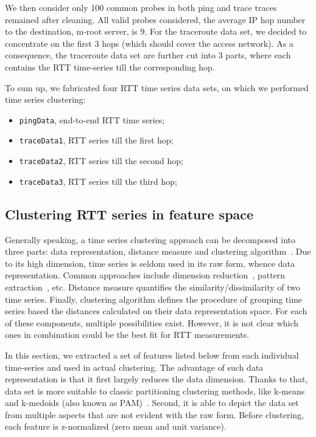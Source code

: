 We then consider only 100 common probes in both ping and trace traces remained after cleaning.
All valid probes considered, the average IP hop number to the destination, m-root server, is 9. 
For the traceroute data set, we decided to concentrate on the first 3 hops (which should cover the access network). As a consequence, the traceroute data set are further cut into 3 parts, where each contains the RTT time-series till the corresponding hop.

To sum up, we fabricated four RTT time series data sets, on which we performed time series clustering:
\begin{itemize}
\item \texttt{pingData}, end-to-end RTT time series;
\item \texttt{traceData1}, RTT series till the first hop;
\item \texttt{traceData2}, RTT series till the second hop;
\item \texttt{traceData3}, RTT series till the third hop;
\end{itemize}

\subsection{Clustering RTT series in feature space}
\label{sec:cls_ft}
Generally speaking, a time series clustering approach can be decomposed into three parts: data representation, distance measure and clustering algorithm~\cite{Aghabozorgi2015}. 
Due to its high dimension, time series is seldom used in its raw form, whence data representation.
Common approaches include dimension reduction~\cite{Elhamifar2013}, pattern extraction~\cite{Ulanova2015}, etc.
Distance measure quantifies the similarity/dissimilarity of two time series. Finally, clustering algorithm defines the procedure of grouping time series based the distances calculated on their data representation space.
For each of these components, multiple possibilities exist. However, it is not clear which ones in combination could be the best fit for RTT measurements. 

In this section, we extracted a set of features listed below from each individual time-series and used in actual clustering. 
The advantage of such data representation is that it first largely reduces the data dimension. Thanks to that, data set is more suitable to classic partitioning clustering methods, like k-means and k-medoids (also known as \acf{PAM})~\cite{Lin2003}.
Second, it is able to depict the data set from multiple aspects that are not evident with the raw form. 
Before clustering, each feature is z-normalized (zero mean and unit variance).

